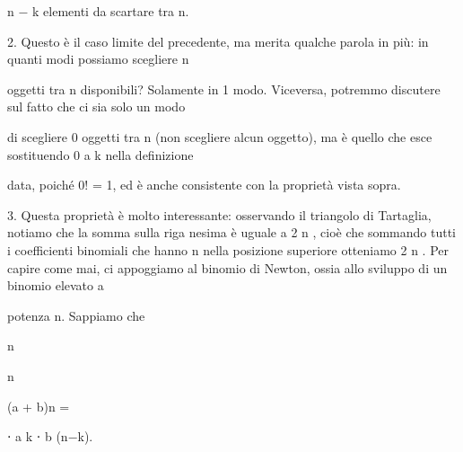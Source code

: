 \documentclass[a4paper,portrait,12pt]{article}
\begin{document}
\begin{flushleft}
n $-$ k elementi da scartare tra n.
\end{flushleft}


\begin{flushleft}
2. Questo \`{e} il caso limite del precedente, ma merita qualche parola in più: in quanti modi possiamo scegliere n
\end{flushleft}


\begin{flushleft}
oggetti tra n disponibili? Solamente in 1 modo. Viceversa, potremmo discutere sul fatto che ci sia solo un modo
\end{flushleft}


\begin{flushleft}
di scegliere 0 oggetti tra n (non scegliere alcun oggetto), ma \`{e} quello che esce sostituendo 0 a k nella definizione
\end{flushleft}


\begin{flushleft}
data, poich\'{e} 0! = 1, ed \`{e} anche consistente con la propriet\`{a} vista sopra.
\end{flushleft}


\begin{flushleft}
3. Questa propriet\`{a} \`{e} molto interessante: osservando il triangolo di Tartaglia, notiamo che la somma sulla riga nesima \`{e} uguale a 2 n , cio\`{e} che sommando tutti i coefficienti binomiali che hanno n nella posizione superiore otteniamo 2 n . Per capire come mai, ci appoggiamo al binomio di Newton, ossia allo sviluppo di un binomio elevato a
\end{flushleft}


\begin{flushleft}
potenza n. Sappiamo che
\end{flushleft}


\begin{flushleft}
n
\end{flushleft}


\begin{flushleft}
n
\end{flushleft}


\begin{flushleft}
(a + b)n =
\end{flushleft}


\begin{flushleft}
⋅ a k ⋅ b (n$-$k).
\end{flushleft}
\end{document}
